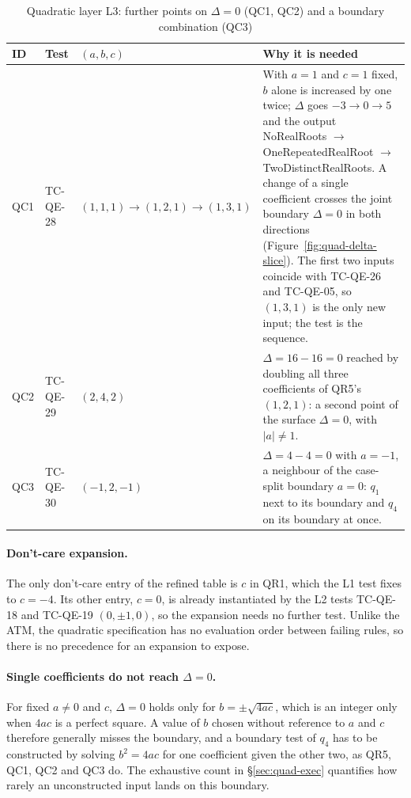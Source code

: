 \documentclass[11pt,a4paper]{article}
\begin{document}
\begin{table}[H]
\centering
\caption{Quadratic layer L3: further points on \(\Delta=0\) (QC1, QC2) and a boundary combination (QC3)}
\label{tab:quad-combos}
\small
\begin{tabularx}{\textwidth}{l l L{3.9cm} Y}
\toprule
ID & Test & \((a,b,c)\) & Why it is needed \\
\midrule
QC1 & TC-QE-28 & \((1,1,1)\to(1,2,1)\to(1,3,1)\) & With \(a=1\) and \(c=1\) fixed, \(b\) alone is increased by one twice; \(\Delta\) goes \(-3\to0\to5\) and the output NoRealRoots \(\to\) OneRepeatedRealRoot \(\to\) TwoDistinctRealRoots. A change of a single coefficient crosses the joint boundary \(\Delta=0\) in both directions (Figure~\ref{fig:quad-delta-slice}). The first two inputs coincide with TC-QE-26 and TC-QE-05, so \((1,3,1)\) is the only new input; the test is the sequence. \\
QC2 & TC-QE-29 & \((2,4,2)\) & \(\Delta=16-16=0\) reached by doubling all three coefficients of QR5's \((1,2,1)\): a second point of the surface \(\Delta=0\), with \(|a|\ne1\). \\
QC3 & TC-QE-30 & \((-1,2,-1)\) & \(\Delta=4-4=0\) with \(a=-1\), a neighbour of the case-split boundary \(a=0\): \(q_1\) next to its boundary and \(q_4\) on its boundary at once. \\
\bottomrule
\end{tabularx}
\end{table}

\paragraph{Don't-care expansion.} The only don't-care entry of the refined
table is \(c\) in QR1, which the L1 test fixes to \(c=-4\). Its other entry,
\(c=0\), is already instantiated by the L2 tests TC-QE-18 and TC-QE-19
\((0,\pm1,0)\), so the expansion needs no further test. Unlike the ATM, the
quadratic specification has no evaluation order between failing rules, so
there is no precedence for an expansion to expose.

\paragraph{Single coefficients do not reach \(\Delta=0\).} For fixed \(a\ne0\)
and \(c\), \(\Delta=0\) holds only for \(b=\pm\sqrt{4ac}\), which is an
integer only when \(4ac\) is a perfect square. A value of \(b\) chosen
without reference to \(a\) and \(c\) therefore generally misses the boundary,
and a boundary test of \(q_4\) has to be constructed by solving \(b^2=4ac\)
for one coefficient given the other two, as QR5, QC1, QC2 and QC3 do. The
exhaustive count in \S\ref{sec:quad-exec} quantifies how rarely an
unconstructed input lands on this boundary.
\end{document}
